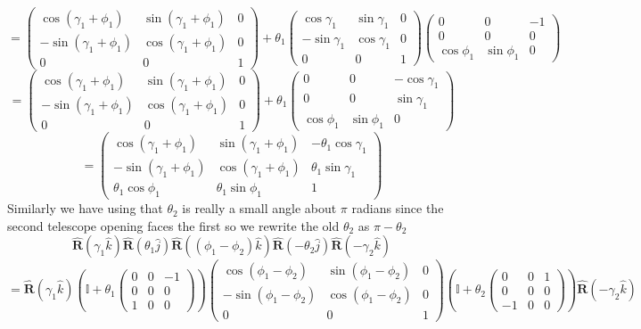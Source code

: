 \documentclass[11pt]{amsart}
\makeatletter
\newcommand{\op}[1]{\mathbf{\hat{#1}}}	%
\newcommand{\se}[1]{\mathbb{#1}}		%
\newcommand{\0}{\varnothing}		%
\newcommand{\1}{!}
\newcommand{\2}{@}
\newcommand{\3}{\#}
\newcommand{\4}{\$}
\newcommand{\5}{\%}
\newcommand{\6}{$^\wedge$}
\newcommand{\7}{\&}
\newcommand{\8}{*}
\newcommand{\9}{(}
\makeatother
\begin{document}
\[
=\begin{pmatrix}
\cos (\gamma_1 +\phi_1)& \sin(\gamma_1 +\phi_1)& 0
\\
-\sin(\gamma_1 +\phi_1) &\cos (\gamma_1 +\phi_1)&0
\\
 0 & 0 & 1
\end{pmatrix}
+
\theta_1
\begin{pmatrix}
\cos \gamma_1 & \sin \gamma_1 & 0
\\
-\sin \gamma_1 &\cos \gamma_1 &0
\\
 0 & 0 & 1
\end{pmatrix}
\begin{pmatrix}
0 & 0 & -1
\\
0 & 0 & 0
\\
\cos \phi_1 & \sin \phi_1 & 0
\end{pmatrix}
\]
\[
=\begin{pmatrix}
\cos (\gamma_1 +\phi_1)& \sin(\gamma_1 +\phi_1)& 0
\\
-\sin(\gamma_1 +\phi_1) &\cos (\gamma_1 +\phi_1)&0
\\
 0 & 0 & 1
\end{pmatrix}
+
\theta_1
\begin{pmatrix}
0 & 0 & -\cos \gamma_1
\\
0 & 0 & \sin \gamma_1
\\
\cos \phi_1 & \sin \phi_1 & 0
\end{pmatrix}
\]
\[
=\begin{pmatrix}
\cos (\gamma_1 +\phi_1)& \sin(\gamma_1 +\phi_1)& -\theta_1\cos \gamma_1
\\
-\sin(\gamma_1 +\phi_1) &\cos (\gamma_1 +\phi_1)&\theta_1 \sin \gamma_1
\\
 \theta_1\cos \phi_1 & \theta_1\sin\phi_1 & 1
\end{pmatrix}
\]
Similarly we have using that $\theta_2$ is really a small angle about $\pi$ radians since the second telescope opening faces the first so we rewrite the old $\theta_2$ as $\pi - \theta_2$ 
\[
\op{R}(\gamma_1\hat{k})\op{R}(\theta_1\hat{j})\op{R}((\phi_1-\phi_2)\hat{k})\op{R}(-\theta_2\hat{j})\op{R}(-\gamma_2\hat{k}) 
\]
\[= \op{R}(\gamma_1\hat{k})\left(\se{I}+\theta_1\begin{pmatrix} 0 & 0 & -1\\0 & 0 & 0\\ 1 & 0 & 0\end{pmatrix}\right)\begin{pmatrix}
\cos \left(\phi_1-\phi_2\right) & \sin\left(\phi_1-\phi_2\right) & 0
\\
-\sin \left(\phi_1-\phi_2\right) & \cos \left(\phi_1-\phi_2\right) & 0 
\\
0 & 0 & 1
\end{pmatrix}\left(\se{I}+\theta_2
\begin{pmatrix}
0 & 0 & 1
\\
0 & 0 & 0
\\
-1 & 0 & 0
\end{pmatrix}\right)\op{R}(-\gamma_2\hat{k})
\]
\end{document}
